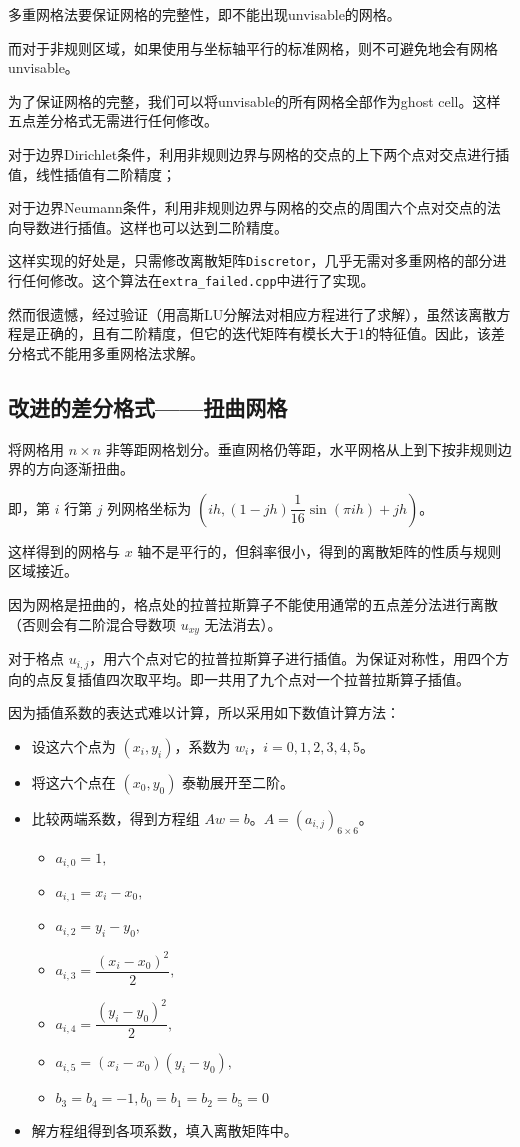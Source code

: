 \documentclass{ctexart}
\begin{document}
多重网格法要保证网格的完整性，即不能出现unvisable的网格。

而对于非规则区域，如果使用与坐标轴平行的标准网格，则不可避免地会有网格unvisable。

为了保证网格的完整，我们可以将unvisable的所有网格全部作为ghost cell。这样五点差分格式无需进行任何修改。

对于边界Dirichlet条件，利用非规则边界与网格的交点的上下两个点对交点进行插值，线性插值有二阶精度；

对于边界Neumann条件，利用非规则边界与网格的交点的周围六个点对交点的法向导数进行插值。这样也可以达到二阶精度。

这样实现的好处是，只需修改离散矩阵\verb|Discretor|，几乎无需对多重网格的部分进行任何修改。这个算法在\verb|extra_failed.cpp|中进行了实现。

然而很遗憾，经过验证（用高斯LU分解法对相应方程进行了求解），虽然该离散方程是正确的，且有二阶精度，但它的迭代矩阵有模长大于1的特征值。因此，该差分格式不能用多重网格法求解。

\subsection{改进的差分格式——扭曲网格}

将网格用 $n\times n$ 非等距网格划分。垂直网格仍等距，水平网格从上到下按非规则边界的方向逐渐扭曲。

即，第 $i$ 行第 $j$ 列网格坐标为 $(ih,(1-jh)\dfrac 1{16}\sin(\pi ih)+jh)$。

这样得到的网格与 $x$ 轴不是平行的，但斜率很小，得到的离散矩阵的性质与规则区域接近。

因为网格是扭曲的，格点处的拉普拉斯算子不能使用通常的五点差分法进行离散（否则会有二阶混合导数项 $u_{xy}$ 无法消去）。

对于格点 $u_{i,j}$，用六个点对它的拉普拉斯算子进行插值。为保证对称性，用四个方向的点反复插值四次取平均。即一共用了九个点对一个拉普拉斯算子插值。

因为插值系数的表达式难以计算，所以采用如下数值计算方法：

\begin{itemize}
	\item 设这六个点为 $(x_i,y_i)$，系数为 $w_i$，$i=0,1,2,3,4,5$。
	\item 将这六个点在 $(x_0,y_0)$ 泰勒展开至二阶。
	\item 比较两端系数，得到方程组 $Aw=b$。$A=(a_{i,j})_{6\times 6}$。
	\begin{itemize}
		\item $a_{i,0} = 1,$
		\item $a_{i,1} = x_i-x_0,$
		\item $a_{i,2} = y_i-y_0,$
		\item $a_{i,3} = \dfrac {(x_i-x_0)^2}2,$
		\item $a_{i,4} = \dfrac {(y_i-y_0)^2}2,$
		\item $a_{i,5} = (x_i-x_0)(y_i-y_0),$
		\item $b_3 = b_4 = -1,b_0 = b_1 = b_2 = b_5 = 0$
	\end{itemize}
	\item 解方程组得到各项系数，填入离散矩阵中。
\end{itemize}
\end{document}
